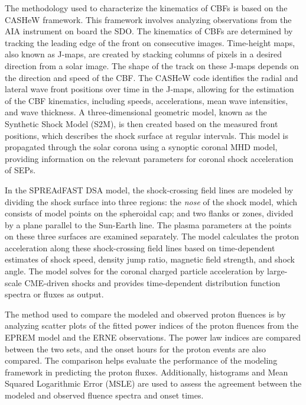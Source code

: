 The methodology used to characterize the kinematics of CBFs is based on the CASHeW framework. This framework involves analyzing observations from the AIA instrument on board the SDO. The kinematics of CBFs are determined by tracking the leading edge of the front on consecutive images. Time-height maps, also known as J-maps, are created by stacking columns of pixels in a desired direction from a solar image. The shape of the track on these J-maps depends on the direction and speed of the CBF. The CASHeW code identifies the radial and lateral wave front positions over time in the J-maps, allowing for the estimation of the CBF kinematics, including speeds, accelerations, mean wave intensities, and wave thickness. A three-dimensional geometric model, known as the Synthetic Shock Model (S2M), is then created based on the measured front positions, which describes the shock surface at regular intervals. This model is propagated through the solar corona using a synoptic coronal MHD model, providing information on the relevant parameters for coronal shock acceleration of SEPs.

In the SPREAdFAST DSA model, the shock-crossing field lines are modeled by dividing the shock surface into three regions: the \textit{nose} of the shock model, which consists of model points on the spheroidal cap; and two flanks or zones, divided by a plane parallel to the Sun-Earth line. The plasma parameters at the points on these three surfaces are examined separately. The model calculates the proton acceleration along these shock-crossing field lines based on time-dependent estimates of shock speed, density jump ratio, magnetic field strength, and shock angle. The model solves for the coronal charged particle acceleration by large-scale CME-driven shocks and provides time-dependent distribution function spectra or fluxes as output.

The method used to compare the modeled and observed proton fluences is by analyzing scatter plots of the fitted power indices of the proton fluences from the EPREM model and the ERNE observations. The power law indices are compared between the two sets, and the onset hours for the proton events are also compared. The comparison helps evaluate the performance of the modeling framework in predicting the proton fluxes. Additionally, histograms and Mean Squared Logarithmic Error (MSLE) are used to assess the agreement between the modeled and observed fluence spectra and onset times.

